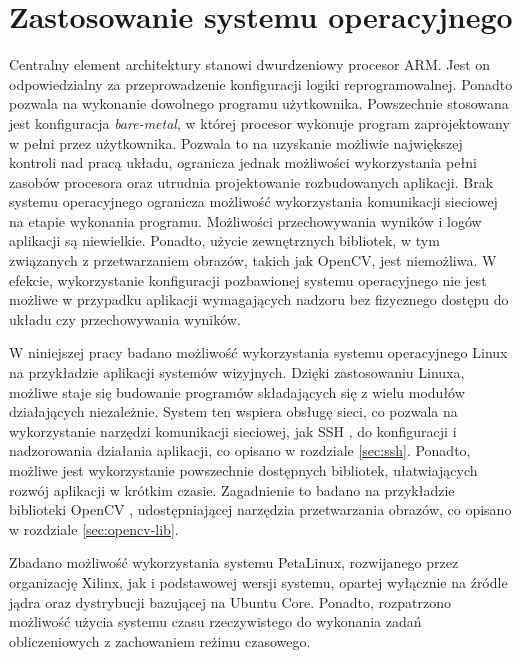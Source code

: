 

\section{Zastosowanie systemu operacyjnego} %
\label{sec:arm-programming}

Centralny element architektury stanowi dwurdzeniowy procesor ARM. 
Jest on odpowiedzialny za przeprowadzenie konfiguracji logiki reprogramowalnej. 
Ponadto pozwala na wykonanie dowolnego programu użytkownika. 
Powszechnie stosowana jest konfiguracja \textit{bare-metal}, w której procesor wykonuje program zaprojektowany w pełni przez użytkownika. 
Pozwala to na uzyskanie możliwie największej kontroli nad pracą układu, ogranicza jednak możliwości wykorzystania pełni zasobów procesora oraz utrudnia projektowanie rozbudowanych aplikacji. 
Brak systemu operacyjnego ogranicza możliwość wykorzystania komunikacji sieciowej na etapie wykonania programu. 
Możliwości przechowywania wyników i logów aplikacji są niewielkie. 
Ponadto, użycie zewnętrznych bibliotek, w tym związanych z przetwarzaniem obrazów, takich jak OpenCV, jest niemożliwa.
W efekcie, wykorzystanie konfiguracji pozbawionej systemu operacyjnego nie jest możliwe w przypadku aplikacji wymagających nadzoru bez fizycznego dostępu do układu czy przechowywania wyników.

W niniejszej pracy badano możliwość wykorzystania systemu operacyjnego Linux na przykładzie aplikacji systemów wizyjnych. 
Dzięki zastosowaniu Linuxa, możliwe staje się budowanie programów składających się z wielu modułów działających niezależnie. 
System ten wspiera obsługę sieci, co pozwala na wykorzystanie narzędzi komunikacji sieciowej, jak SSH \cite{ssh-protocol}, do konfiguracji i nadzorowania działania aplikacji, co opisano w rozdziale \ref{sec:ssh}. 
Ponadto, możliwe jest wykorzystanie powszechnie dostępnych bibliotek, ułatwiających rozwój aplikacji w krótkim czasie. 
Zagadnienie to badano na przykładzie biblioteki OpenCV \cite{opencv-library}, udostępniającej narzędzia przetwarzania obrazów, co opisano w rozdziale \ref{sec:opencv-lib}.

Zbadano możliwość wykorzystania systemu PetaLinux, rozwijanego przez organizację Xilinx, jak i podstawowej wersji systemu, opartej wyłącznie na źródle jądra oraz dystrybucji bazującej na Ubuntu Core.
Ponadto, rozpatrzono możliwość użycia systemu czasu rzeczywistego do wykonania zadań obliczeniowych z zachowaniem reżimu czasowego.


